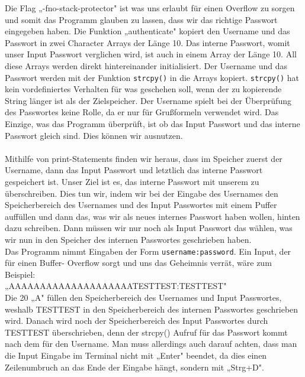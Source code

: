 \documentclass[12pt, a4paper, titlepage, oneside]{scrartcl}
\begin{document}
	Die Flag „-fno-stack-protector" ist was uns erlaubt für einen Overflow zu sorgen und somit das
	Programm glauben zu lassen, dass wir das richtige Passwort eingegeben haben. Die Funktion
	„authenticate" kopiert den Username und das Passwort in zwei Character Arrays der Länge 10. Das
	interne Passwort, womit unser Input Passwort verglichen wird, ist auch in einem Array der Länge
	10. All diese Arrays werden direkt hintereinander initialisiert. Der Username und das Passwort
	werden mit der Funktion \lstinline{strcpy()} in die Arrays kopiert. \lstinline{strcpy()} hat kein vordefiniertes Verhalten für
	was geschehen soll, wenn der zu kopierende String länger ist als der Zielspeicher. Der Username
	spielt bei der Überprüfung des Passwortes keine Rolle, da er nur für Grußformeln verwendet wird.
	Das Einzige, was das Programm überprüft, ist ob das Input Passwort und das interne Passwort
	gleich sind. Dies können wir ausnutzen. \\
	\\
	Mithilfe von print-Statements finden wir heraus, dass im Speicher zuerst der Username, dann das
	Input Passwort und letztlich das interne Passwort gespeichert ist. Unser Ziel ist es, das interne
	Passwort mit unserem zu überschreiben. Dies tun wir, indem wir bei der Eingabe des Usernames
	den Speicherbereich des Usernames und des Input Passwortes mit einem Puffer auffüllen und dann
	das, was wir als neues internes Passwort haben wollen, hinten dazu schreiben. Dann müssen wir nur
	noch als Input Passwort das wählen, was wir nun in den Speicher des internen Passwortes
	geschrieben haben. \\
	Das Programm nimmt Eingaben der Form \lstinline{username:password}. Ein Input, der für einen Buffer-
	Overflow sorgt und uns das Geheimnis verrät, wäre zum Beispiel:\\
	„AAAAAAAAAAAAAAAAAAAATESTTEST:TESTTEST" \\
	Die 20 „A" füllen den Speicherbereich des Usernames und Input Passwortes, weshalb TESTTEST
	in den Speicherbereich des internen Passwortes geschrieben wird. Danach wird noch der
	Speicherbereich des Input Passwortes durch TESTTEST überschrieben, denn der strcpy() Aufruf für
	das Passwort kommt nach dem für den Username. Man muss allerdings auch darauf achten, dass
	man die Input Eingabe im Terminal nicht mit „Enter" beendet, da dies einen Zeilenumbruch an das
	Ende der Eingabe hängt, sondern mit „Strg+D".
\end{document}
